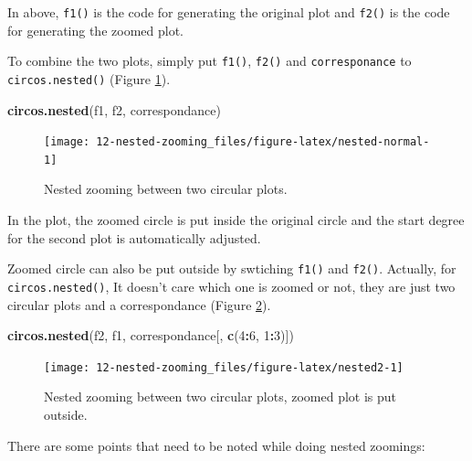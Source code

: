 \documentclass[]{book}
\newenvironment{Shaded}{\begin{snugshade}}{\end{snugshade}}
\newcommand{\KeywordTok}[1]{\textcolor[rgb]{0.13,0.29,0.53}{\textbf{#1}}}
\newcommand{\DecValTok}[1]{\textcolor[rgb]{0.00,0.00,0.81}{#1}}
\newcommand{\OperatorTok}[1]{\textcolor[rgb]{0.81,0.36,0.00}{\textbf{#1}}}
\newcommand{\NormalTok}[1]{#1}
\theoremstyle{definition}
\theoremstyle{definition}
\theoremstyle{remark}
\begin{document}
In above, \texttt{f1()} is the code for generating the original plot and
\texttt{f2()} is the code for generating the zoomed plot.

To combine the two plots, simply put \texttt{f1()}, \texttt{f2()} and
\texttt{corresponance} to \texttt{circos.nested()} (Figure
\ref{fig:nested-normal}).

\begin{Shaded}
\begin{Highlighting}[]
\KeywordTok{circos.nested}\NormalTok{(f1, f2, correspondance)}
\end{Highlighting}
\end{Shaded}

\begin{figure}

{\centering \texttt{[image: 12-nested-zooming\_files/figure-latex/nested-normal-1]} 

}

\caption{Nested zooming between two circular plots.}\label{fig:nested-normal}
\end{figure}

In the plot, the zoomed circle is put inside the original circle and the
start degree for the second plot is automatically adjusted.

Zoomed circle can also be put outside by swtiching \texttt{f1()} and
\texttt{f2()}. Actually, for \texttt{circos.nested()}, It doesn't care
which one is zoomed or not, they are just two circular plots and a
correspondance (Figure \ref{fig:nested2}).

\begin{Shaded}
\begin{Highlighting}[]
\KeywordTok{circos.nested}\NormalTok{(f2, f1, correspondance[, }\KeywordTok{c}\NormalTok{(}\DecValTok{4}\OperatorTok{:}\DecValTok{6}\NormalTok{, }\DecValTok{1}\OperatorTok{:}\DecValTok{3}\NormalTok{)])}
\end{Highlighting}
\end{Shaded}

\begin{figure}

{\centering \texttt{[image: 12-nested-zooming\_files/figure-latex/nested2-1]} 

}

\caption{Nested zooming between two circular plots, zoomed plot is put outside.}\label{fig:nested2}
\end{figure}

There are some points that need to be noted while doing nested zoomings:
\end{document}
